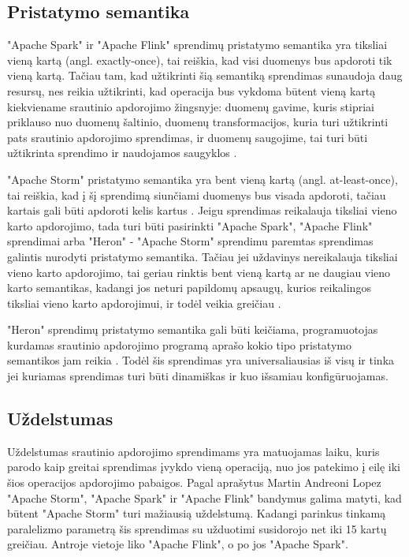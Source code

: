 \documentclass{VUMIFPSbakalaurinis}
\begin{document}
\subsection{Pristatymo semantika}
"Apache Spark" ir "Apache Flink" sprendimų pristatymo semantika yra tiksliai vieną kartą (angl. exactly-once), tai reiškia, kad visi duomenys bus apdoroti tik vieną kartą. Tačiau tam, kad užtikrinti šią semantiką sprendimas sunaudoja daug resursų, nes reikia užtikrinti, kad operacija bus vykdoma būtent vieną kartą kiekviename srautinio apdorojimo žingsnyje: duomenų gavime, kuris stipriai priklauso nuo duomenų šaltinio, duomenų transformacijos, kuria turi užtikrinti pats srautinio apdorojimo sprendimas, ir duomenų saugojime, tai turi būti užtikrinta sprendimo ir naudojamos saugyklos \cite{zhang20}.\par

"Apache Storm" pristatymo semantika yra bent vieną kartą (angl. at-least-once), tai reiškia, kad į šį sprendimą siunčiami duomenys bus visada apdoroti, tačiau kartais gali būti apdoroti kelis kartus \cite{prithi20}. Jeigu sprendimas reikalauja tiksliai vieno karto apdorojimo, tada turi būti pasirinkti "Apache Spark", "Apache Flink" sprendimai arba "Heron" - "Apache Storm" sprendimu paremtas sprendimas galintis nurodyti pristatymo semantika. Tačiau jei uždavinys nereikalauja tiksliai vieno karto apdorojimo, tai geriau rinktis bent vieną kartą ar ne daugiau vieno karto semantikas, kadangi jos neturi papildomų apsaugų, kurios reikalingos tiksliai vieno karto apdorojimui, ir todėl veikia greičiau \cite{zhang20}. \par

"Heron" sprendimų pristatymo semantika gali būti keičiama, programuotojas kurdamas srautinio apdorojimo programą aprašo kokio tipo pristatymo semantikos jam reikia \cite{delivery-semantics}. Todėl šis sprendimas yra universaliausias iš visų ir tinka jei kuriamas sprendimas turi būti dinamiškas ir kuo išsamiau konfigūruojamas.   

\subsection{Uždelstumas}

Uždelstumas srautinio apdorojimo sprendimams yra matuojamas laiku, kuris parodo kaip greitai sprendimas įvykdo vieną operaciją, nuo jos patekimo į eilę iki šios operacijos apdorojimo pabaigos. Pagal \cite{Lopez2016APC} aprašytus Martin Andreoni Lopez "Apache Storm", "Apache Spark" ir "Apache Flink" bandymus galima matyti, kad būtent "Apache Storm" turi mažiausią uždelstumą. Kadangi parinkus tinkamą paralelizmo parametrą šis sprendimas su užduotimi susidorojo net iki 15 kartų greičiau. Antroje vietoje liko "Apache Flink", o po jos "Apache Spark". \par
\end{document}
